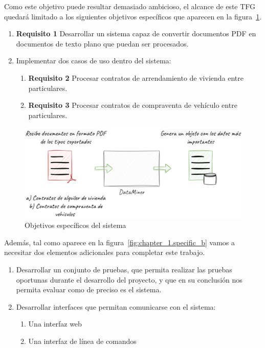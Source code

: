 Como este objetivo puede resultar demasiado ambicioso, el alcance de este TFG quedará limitado a los siguientes
objetivos específicos que aparecen en la figura~\ref{fig:chapter_1.specific_a}.

\begin{enumerate}
    \item \textbf{Requisito 1} Desarrollar un sistema capaz de convertir documentos PDF en documentos de texto
    plano que puedan ser procesados\label{req:transform_pdf_to_text}.
    \item Implementar dos casos de uso dentro del sistema:
    \begin{enumerate}
        \item \textbf{Requisito 2} Procesar contratos de arrendamiento de vivienda entre
        particulares\label{req:residence_lease_agreement}.
        \item \textbf{Requisito 3} Procesar contratos de compraventa de vehículo entre
        particulares\label{req:sale_and_purchase_agreement}.
    \end{enumerate}
\end{enumerate}

\begin{figure}[ht]
    \begin{center}
        \includegraphics[width=\textwidth]{chapter/1/images/chapter_1.specific_a}
        \caption{Objetivos específicos del sistema}
        \label{fig:chapter_1.specific_a}
    \end{center}
\end{figure}

Además, tal como aparece en la figura~\ref{fig:chapter_1.specific_b} vamos a necesitar dos elementos adicionales para
completar este trabajo.

\begin{enumerate}
    \item Desarrollar un conjunto de pruebas, que permita realizar las pruebas oportunas durante el desarrollo del
    proyecto, y que en su conclusión nos permita evaluar como de preciso es el sistema.
    \item Desarrollar interfaces que permitan comunicarse con el sistema:
    \begin{enumerate}
        \item  Una interfaz web
        \item  Una interfaz de línea de comandos
    \end{enumerate}
\end{enumerate}

